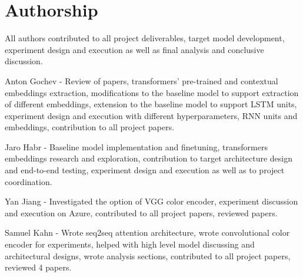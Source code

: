 \section*{Authorship}

All authors contributed to all project deliverables, target model development, experiment design and execution as well as final analysis and conclusive discussion.

Anton Gochev - Review of papers, transformers’ pre-trained and contextual embeddings extraction, modifications to the baseline model to support extraction of different embeddings, extension to the baseline model to support LSTM units, experiment design and execution with different hyperparameters, RNN units and embeddings, contribution to all project papers.

Jaro Habr - Baseline model implementation and finetuning, transformers embeddings research and exploration, contribution to target architecture design and end-to-end testing, experiment design and execution as well as to project coordination.

Yan Jiang - Investigated the option of VGG color encoder, experiment discussion and execution on Azure, contributed to all project papers, reviewed papers.

Samuel Kahn - Wrote seq2seq attention architecture, wrote convolutional color encoder for experiments, helped with high level model discussing and architectural designs, wrote analysis sections, contributed to all project papers, reviewed 4 papers.
